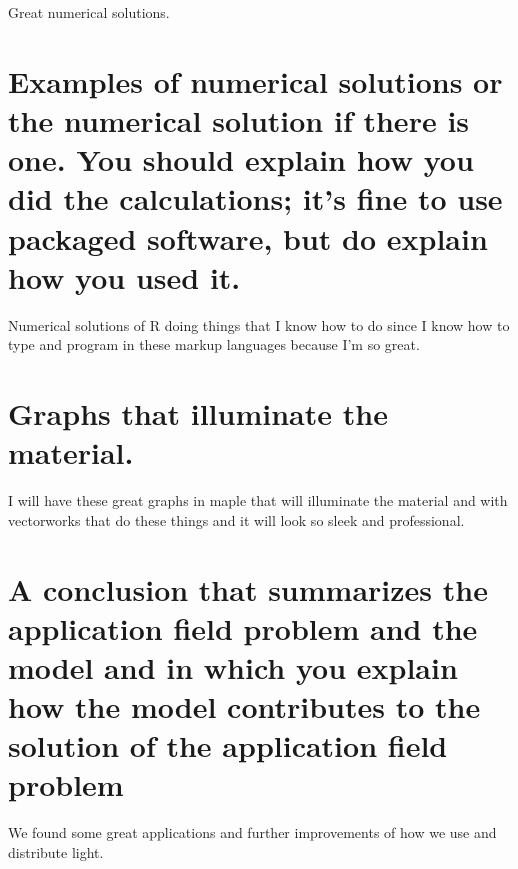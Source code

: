 \documentclass{article}
\begin{document}
Great numerical solutions. 

\section{Examples of numerical solutions or the numerical solution if there is one. You should explain how you did the calculations; it’s fine to use packaged software, but do explain how you used it.} 
Numerical solutions of R doing things that I know how to do since I know how to type and program in these markup languages because I'm so great. 

\section{Graphs that illuminate the material.}
I will have these great graphs in maple that will illuminate the material and with vectorworks that do these things and it will look so sleek and professional. 

\section{A conclusion that summarizes the application field problem and the model and in which you explain how the model contributes to the solution of the application field problem} 

We found some great applications and further improvements of how we use and distribute light. 



\end{document}
